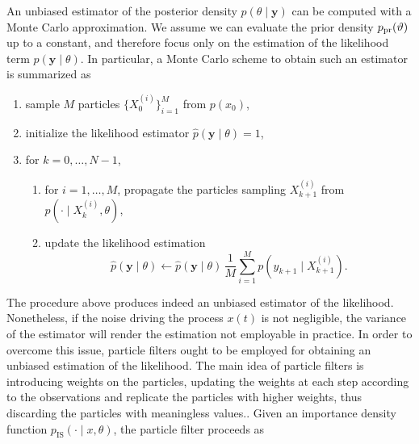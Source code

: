 \documentclass[10pt]{article}
\begin{document}
An unbiased estimator of the posterior density $p(\theta \mid \mathbf y)$ can be computed with a Monte Carlo approximation. We assume we can evaluate the prior density $p_{\mathrm{pr}}(\vartheta)$ up to a constant, and therefore focus only on the estimation of the likelihood term $p(\mathbf y \mid \theta)$. In particular, a Monte Carlo scheme to obtain such an estimator is summarized as
\begin{enumerate}[label=\arabic*)]
	\item sample $M$ particles $\{X^{(i)}_0\}_{i=1}^M$ from $p(x_0)$,
	\item initialize the likelihood estimator $\hat p(\mathbf y \mid \theta) = 1$,
	\item\label{it:extForMC} for $k = 0, \ldots, N-1$,
		\begin{enumerate}[label=\ref{it:extForMC}.\arabic*)]
			\item for $i = 1, \ldots, M$, propagate the particles sampling $X^{(i)}_{k+1}$ from $p(\cdot \mid X_k^{(i)}, \theta)$,
			\item update the likelihood estimation 
			\begin{equation}
				\hat p(\mathbf y \mid \theta) \leftarrow \hat p(\mathbf y \mid \theta) \, \frac{1}{M} \sum_{i=1}^M p(y_{k+1} \mid X_{k+1}^{(i)}).
			\end{equation} 
		\end{enumerate}
\end{enumerate} 
The procedure above produces indeed an unbiased estimator of the likelihood. Nonetheless, if the noise driving the process $x(t)$ is not negligible, the variance of the estimator will render the estimation not employable in practice. In order to overcome this issue, particle filters ought to be employed for obtaining an unbiased estimation of the likelihood. The main idea of particle filters is introducing weights on the particles, updating the weights at each step according to the observations and replicate the particles with higher weights, thus discarding the particles with meaningless values.. Given an importance density function $p_{\mathrm{IS}}(\cdot \mid x, \theta)$, the particle filter proceeds as
\end{document}
